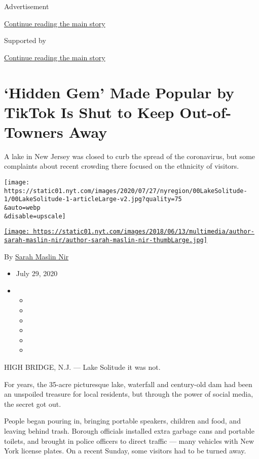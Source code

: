 Advertisement

\protect\hyperlink{after-top}{Continue reading the main story}

Supported by

\protect\hyperlink{after-sponsor}{Continue reading the main story}

\hypertarget{hidden-gem-made-popular-by-tiktok-is-shut-to-keep-out-of-towners-away}{%
\section{`Hidden Gem' Made Popular by TikTok Is Shut to Keep
Out-of-Towners
Away}\label{hidden-gem-made-popular-by-tiktok-is-shut-to-keep-out-of-towners-away}}

A lake in New Jersey was closed to curb the spread of the coronavirus,
but some complaints about recent crowding there focused on the ethnicity
of visitors.

\texttt{[image: https://static01.nyt.com/images/2020/07/27/nyregion/00LakeSolitude-1/00LakeSolitude-1-articleLarge-v2.jpg?quality=75\\\&auto=webp\\\&disable=upscale]}

\href{https://www.nytimes.com/by/sarah-maslin-nir}{\texttt{[image: https://static01.nyt.com/images/2018/06/13/multimedia/author-sarah-maslin-nir/author-sarah-maslin-nir-thumbLarge.jpg]}}

By \href{https://www.nytimes.com/by/sarah-maslin-nir}{Sarah Maslin Nir}

\begin{itemize}
\item
  July 29, 2020
\item
  \begin{itemize}
  \item
  \item
  \item
  \item
  \item
  \item
  \end{itemize}
\end{itemize}

HIGH BRIDGE, N.J. --- Lake Solitude it was not.

For years, the 35-acre picturesque lake, waterfall and century-old dam
had been an unspoiled treasure for local residents, but through the
power of social media, the secret got out.

People began pouring in, bringing portable speakers, children and food,
and leaving behind trash. Borough officials installed extra garbage cans
and portable toilets, and brought in police officers to direct traffic
--- many vehicles with New York license plates. On a recent Sunday, some
visitors had to be turned away.

